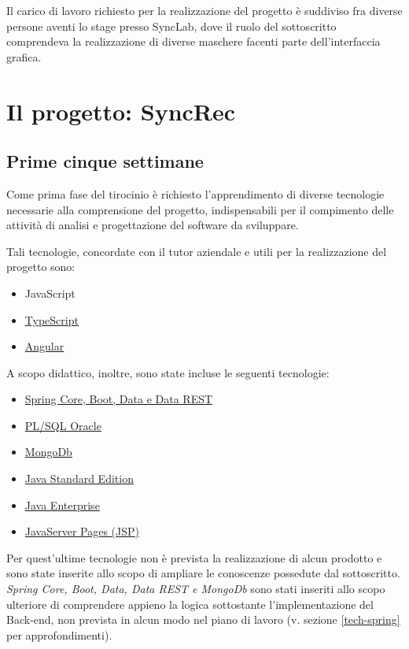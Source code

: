 Il carico di lavoro richiesto per la realizzazione del progetto è suddiviso fra diverse persone aventi lo stage presso SyncLab, dove il ruolo del sottoscritto comprendeva la realizzazione di diverse maschere facenti parte dell'interfaccia grafica.\\

\section{Il progetto: SyncRec}\label{ch-2.2}
\subsection{Prime cinque settimane}
Come prima fase del tirocinio è richiesto l'apprendimento di diverse tecnologie necessarie alla comprensione del progetto,  indispensabili per il compimento delle attività di analisi e progettazione del software da sviluppare.

Tali tecnologie, concordate con il tutor aziendale e utili per la realizzazione del progetto sono:
\begin{itemize}
	\item \gls{JavaScript}
	\item \hyperref[typescript]{TypeScript}
	\item \hyperref[angular]{Angular}
\end{itemize}

A scopo didattico, inoltre, sono state incluse le seguenti tecnologie:
\begin{itemize}
	\item \hyperref[tech-spring]{Spring Core, Boot, Data e Data REST}
	\item \hyperref[plsql]{PL/SQL Oracle}
	\item \hyperref[mongodb]{MongoDb}
	\item \hyperref[java]{Java Standard Edition}
	\item \hyperref[java]{Java Enterprise}
	\item \hyperref[jsp]{JavaServer Pages (JSP)}
\end{itemize}


Per quest'ultime tecnologie non è prevista la realizzazione di alcun prodotto e sono state inserite allo scopo di ampliare le conoscenze possedute dal sottoscritto.\\
\textit{Spring Core, Boot, Data, Data REST e MongoDb} sono stati inseriti allo scopo ulteriore di comprendere appieno la logica sottostante l'implementazione del \gls{Back-end}, non prevista in alcun modo nel piano di lavoro (v. sezione \ref{tech-spring} per approfondimenti).\\

